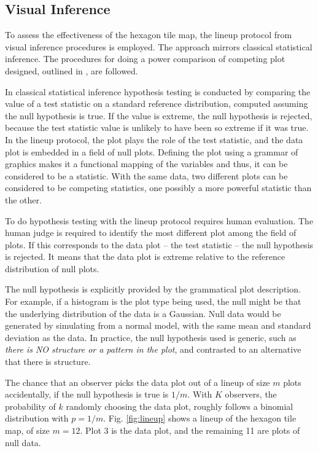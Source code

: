 \documentclass[times, doublespace]{anzsauth}
\begin{document}
\subsection{Visual Inference}\label{visual-inference}

To assess the effectiveness of the hexagon tile map, the lineup
protocol \citep{GIIV, BCHLLSW09}
from visual inference procedures is employed. The approach mirrors
classical statistical inference. The procedures for doing a power
comparison of competing plot designed, outlined in
\cite{GTPCCD}, are followed.

In classical statistical inference hypothesis testing is conducted by
comparing the value of a test statistic on a standard reference
distribution, computed assuming the null hypothesis is true. If the
value is extreme, the null hypothesis is rejected, because the test
statistic value is unlikely to have been so extreme if it was true. In
the lineup protocol, the plot plays the role of the test statistic, and
the data plot is embedded in a field of null plots. Defining the plot
using a grammar of graphics \citep{ggplot2} makes it a
functional mapping of the variables and thus, it can be considered to be
a statistic. With the same data, two different plots can be considered
to be competing statistics, one possibly a more powerful statistic than
the other.

To do hypothesis testing with the lineup protocol requires human
evaluation. The human judge is required to identify the most different
plot among the field of plots. If this corresponds to the data plot --
the test statistic -- the null hypothesis is rejected. It means that the
data plot is extreme relative to the reference distribution of null
plots.

The null hypothesis is explicitly provided by the grammatical plot
description. For example, if a histogram is the plot type being used,
the null might be that the underlying distribution of the data is a
Gaussian. Null data would be generated by simulating from a normal
model, with the same mean and standard deviation as the data. In
practice, the null hypothesis used is generic, such as \emph{there is NO
structure or a pattern in the plot}, and contrasted to an alternative
that there is structure.

The chance that an observer picks the data plot out of a lineup of size
\(m\) plots accidentally, if the null hypothesis is true is \(1/m\).
With \(K\) observers, the probability of \(k\) randomly choosing the
data plot, roughly follows a binomial distribution with \(p=1/m\). Fig.
\ref{fig:lineup} shows a lineup of the hexagon tile map, of size
\(m=12\). Plot 3 is the data plot, and the remaining 11 are plots of
null data.
\end{document}
